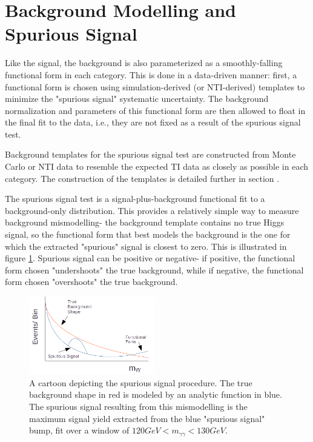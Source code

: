 \section{Background Modelling and Spurious Signal} \label{sec:background_modelling} 

Like the signal, the background is also parameterized as a smoothly-falling functional form in each category. This is done in a data-driven manner: first, a functional form is chosen using simulation-derived (or NTI-derived) templates to minimize the "spurious signal" systematic uncertainty. The background normalization and parameters of this functional form are then allowed to float in the final fit to the data, i.e., they are not fixed as a result of the spurious signal test. 

Background templates for the spurious signal test are constructed from Monte Carlo or NTI data to resemble the expected TI data as closely as possible in each category. The construction of the templates is detailed further in section \label{sec:bkgtemplates}.

The spurious signal test is a signal-plus-background functional fit to a background-only distribution. This provides a relatively simple way to measure background mismodelling- the background template contains no true Higgs signal, so the functional form that best models the background is the one for which the extracted "spurious" signal is closest to zero. This is illustrated in figure \ref{fig:SScartoon}. Spurious signal can be positive or negative- if positive, the functional form chosen "undershoots" the true background, while if negative, the functional form chosen "overshoots" the true background.

\begin{figure}
\centering
\includegraphics[width=0.49\textwidth]{figures/sigbkgparam/SSCartoon.png}
\caption{A cartoon depicting the spurious signal procedure. The true background shape in red is modeled by an analytic function in blue. The spurious signal resulting from this mismodelling is the maximum signal yield extracted from the blue "spurious signal" bump, fit over a window of $120 GeV < m_{\gamma \gamma}<130 GeV$.}
\label{fig:SScartoon}
\end{figure} 

